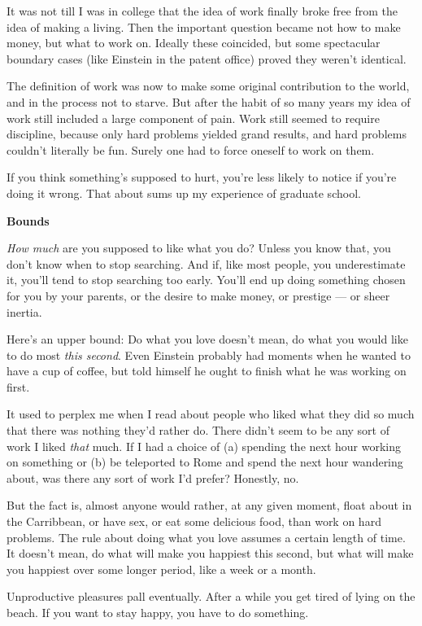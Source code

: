 \documentclass[12pt]{book}
\begin{document}
It was not till I was in college that the idea of work finally broke
free from the idea of making a living. Then the important question
became not how to make money, but what to work on. Ideally these
coincided, but some spectacular boundary cases (like Einstein in the
patent office) proved they weren't identical.

The definition of work was now to make some original contribution to the
world, and in the process not to starve. But after the habit of so many
years my idea of work still included a large component of pain. Work
still seemed to require discipline, because only hard problems yielded
grand results, and hard problems couldn't literally be fun. Surely one
had to force oneself to work on them.

If you think something's supposed to hurt, you're less likely to notice
if you're doing it wrong. That about sums up my experience of graduate
school.

\textbf{Bounds}

\emph{How much} are you supposed to like what you do? Unless you know
that, you don't know when to stop searching. And if, like most people,
you underestimate it, you'll tend to stop searching too early. You'll
end up doing something chosen for you by your parents, or the desire to
make money, or prestige --- or sheer inertia.

Here's an upper bound: Do what you love doesn't mean, do what you would
like to do most \emph{this second}. Even Einstein probably had moments
when he wanted to have a cup of coffee, but told himself he ought to
finish what he was working on first.

It used to perplex me when I read about people who liked what they did
so much that there was nothing they'd rather do. There didn't seem to be
any sort of work I liked \emph{that} much. If I had a choice of (a)
spending the next hour working on something or (b) be teleported to Rome
and spend the next hour wandering about, was there any sort of work I'd
prefer? Honestly, no.

But the fact is, almost anyone would rather, at any given moment, float
about in the Carribbean, or have sex, or eat some delicious food, than
work on hard problems. The rule about doing what you love assumes a
certain length of time. It doesn't mean, do what will make you happiest
this second, but what will make you happiest over some longer period,
like a week or a month.

Unproductive pleasures pall eventually. After a while you get tired of
lying on the beach. If you want to stay happy, you have to do something.
\end{document}
